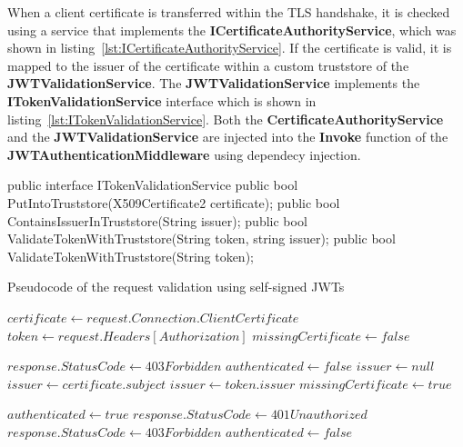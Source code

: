 When a client certificate is transferred within the TLS handshake, it is checked using a service that implements the \textbf{ICertificateAuthorityService}, which was shown in listing~\ref{lst:ICertificateAuthorityService}.
If the certificate is valid, it is mapped to the issuer of the certificate within a custom truststore of the \textbf{JWTValidationService}.
The \textbf{JWTValidationService} implements the \textbf{ITokenValidationService} interface which is shown in listing~\ref{lst:ITokenValidationService}.
Both the \textbf{CertificateAuthorityService} and the \textbf{JWTValidationService} are injected into the \textbf{Invoke} function of the \textbf{JWTAuthenticationMiddleware} using dependecy injection.

\noindent \begin{minipage}{\linewidth}
\begin{CsCode}[label={lst:ITokenValidationService}, caption={ITokenValidationService interface, which is implemented by the injected JWTValidationService},captionpos=b]
public interface ITokenValidationService {
	public bool PutIntoTruststore(X509Certificate2 certificate);
	public bool ContainsIssuerInTruststore(String issuer);
	public bool ValidateTokenWithTruststore(String token, string issuer);
	public bool ValidateTokenWithTruststore(String token);
}
\end{CsCode}
\end{minipage}

\begin{algorithm}
\caption{Pseudocode of the request validation using self-signed JWTs}\label{alg:jwt}
\begin{algorithmic}
\State $certificate \gets request.Connection.ClientCertificate$
\State $token \gets request.Headers[Authorization]$
\State $missingCertificate \gets false$

	\State $response.StatusCode \gets 403Forbidden$
	\State $authenticated \gets false$
\Else
	\State $issuer \gets null$
				\State $issuer \gets certificate.subject$
			\EndIf
		\EndIf
	\Else
			\State $issuer \gets token.issuer$
		\Else
			\State $missingCertificate \gets true$
		\EndIf
	\EndIf

		\State $authenticated \gets true$
	\Else
			\State $response.StatusCode \gets 401Unauthorized$
		\Else
			\State $response.StatusCode \gets 403Forbidden$
		\EndIf
		\State $authenticated \gets false$
	\EndIf
\EndIf
\end{algorithmic}
\end{algorithm}

